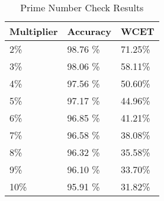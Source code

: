 \begin{table}[]
  \centering
  \caption{Prime Number Check Results}
  \label{primeT}
  \begin{tabular}{|l|l|l|}
    \hline
    \textbf{Multiplier} & \textbf{Accuracy}  & \textbf{WCET}   \\ \hline
2\% &  98.76
\% &71.25\%   \\ \hline
3\% &  98.06
\% &58.11\%   \\ \hline
4\% &  97.56
\% &50.60\%   \\ \hline
5\% &  97.17
\% &44.96\%   \\ \hline
6\% &  96.85
\% &41.21\%   \\ \hline
7\% &  96.58
\% &38.08\%   \\ \hline
8\% &  96.32
\% &35.58\%   \\ \hline
9\% &  96.10
\% &33.70\%   \\ \hline
10\% &  95.91
\% &31.82\%   \\ \hline
  \end{tabular}
\end{table}
